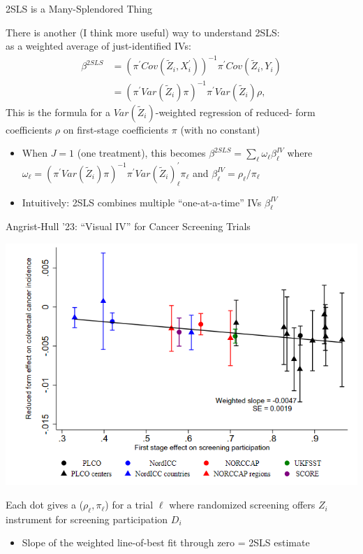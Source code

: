 \documentclass{beamer}
\begin{document}
\begin{frame}{2SLS is a Many-Splendored Thing}

There is another (I think more useful) way to understand 2SLS: \\ as a weighted average of just-identified IVs:
\begin{align*}
\beta^{2SLS}&=\left(\pi^\prime Cov(\tilde{Z}_i,X_i^\prime)\right)^{-1} \pi^\prime Cov(\tilde{Z}_i,Y_i)\\
&=(\pi^\prime Var(\tilde{Z}_i)\pi)^{-1}\pi^\prime Var(\tilde{Z}_i)\rho,
\end{align*}
This is the formula for a $Var(\tilde{Z}_i)$-weighted regression of reduced- form coefficients $\rho$ on first-stage coefficients $\pi$ (with no constant)\pause{}
\begin{itemize}
\item When $J=1$ (one treatment), this becomes $\beta^{2SLS}=\sum_\ell \omega_\ell \beta_\ell^{IV}$ where $\omega_\ell=(\pi^\prime Var(\tilde{Z}_i)\pi)^{-1}\pi^\prime Var(\tilde{Z}_i)^\prime_\ell\pi_\ell$ and $\beta^{IV}_\ell = \rho_\ell/\pi_\ell$
\item Intuitively: 2SLS combines multiple ``one-at-a-time'' IVs $\beta_\ell^{IV}$
\end{itemize}

\end{frame}

\begin{frame}{Angrist-Hull '23: ``Visual IV'' for Cancer Screening Trials}
\begin{center}
\includegraphics[scale=0.5]{./lecture_includes/pragmaticTrials.png}
\vspace{-0.3cm}
\end{center}
Each dot gives a ($\rho_\ell,\pi_\ell$) for a trial $\ell$ where  randomized screening offers $Z_i$ instrument for screening participation $D_i$
\begin{itemize}
\item Slope of the weighted line-of-best fit through zero = 2SLS estimate
\end{itemize}
\end{frame}
\end{document}
